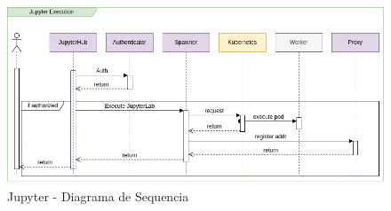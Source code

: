 \documentclass[10pt,brazil]{beamer}
\theoremstyle{definition}
\begin{document}
\begin{frame}[plain]
\begin{figure}
\begin{center}
\begin{overprint}
          \includegraphics[width=1\textwidth]{seq-jupy-8.png}
        \end{overprint}
      \end{center}  
      \caption[Jupyter - Diagrama de Sequencia]{Jupyter - Diagrama de Sequencia}
  \end{figure}  
\end{frame}
\end{document}
